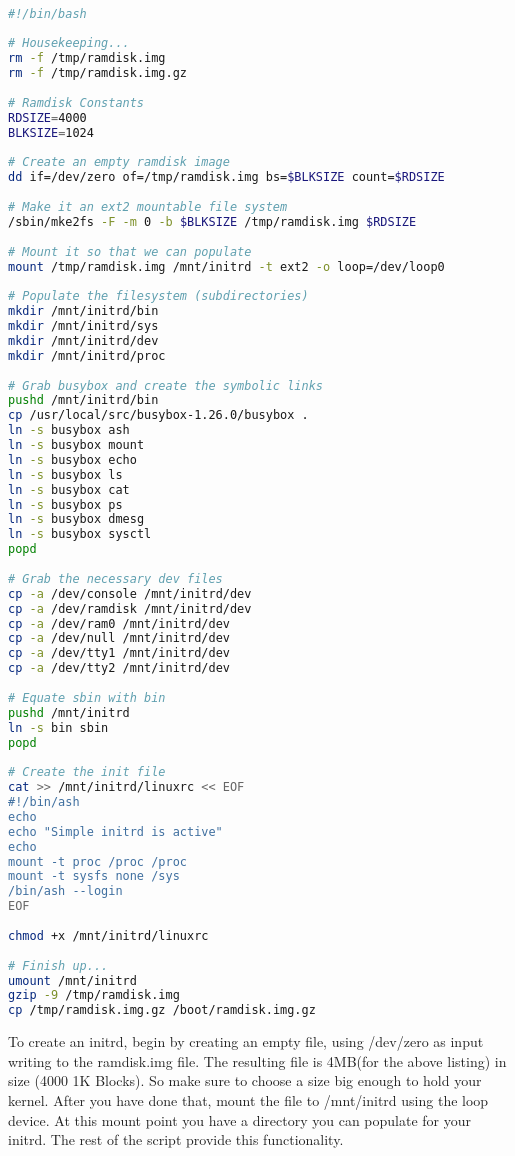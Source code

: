 \documentclass[a4paper,11pt]{report}
\begin{document}
\begin{lstlisting}[language=bash,caption={Manually creating initrd script}]

#!/bin/bash
 
# Housekeeping...
rm -f /tmp/ramdisk.img
rm -f /tmp/ramdisk.img.gz
 
# Ramdisk Constants
RDSIZE=4000
BLKSIZE=1024
 
# Create an empty ramdisk image
dd if=/dev/zero of=/tmp/ramdisk.img bs=$BLKSIZE count=$RDSIZE
 
# Make it an ext2 mountable file system
/sbin/mke2fs -F -m 0 -b $BLKSIZE /tmp/ramdisk.img $RDSIZE
 
# Mount it so that we can populate
mount /tmp/ramdisk.img /mnt/initrd -t ext2 -o loop=/dev/loop0
 
# Populate the filesystem (subdirectories)
mkdir /mnt/initrd/bin
mkdir /mnt/initrd/sys
mkdir /mnt/initrd/dev
mkdir /mnt/initrd/proc
 
# Grab busybox and create the symbolic links
pushd /mnt/initrd/bin
cp /usr/local/src/busybox-1.26.0/busybox .
ln -s busybox ash
ln -s busybox mount
ln -s busybox echo
ln -s busybox ls
ln -s busybox cat
ln -s busybox ps
ln -s busybox dmesg
ln -s busybox sysctl
popd
 
# Grab the necessary dev files
cp -a /dev/console /mnt/initrd/dev
cp -a /dev/ramdisk /mnt/initrd/dev
cp -a /dev/ram0 /mnt/initrd/dev
cp -a /dev/null /mnt/initrd/dev
cp -a /dev/tty1 /mnt/initrd/dev
cp -a /dev/tty2 /mnt/initrd/dev
 
# Equate sbin with bin
pushd /mnt/initrd
ln -s bin sbin
popd
 
# Create the init file
cat >> /mnt/initrd/linuxrc << EOF
#!/bin/ash
echo
echo "Simple initrd is active"
echo
mount -t proc /proc /proc
mount -t sysfs none /sys
/bin/ash --login
EOF
 
chmod +x /mnt/initrd/linuxrc
 
# Finish up...
umount /mnt/initrd
gzip -9 /tmp/ramdisk.img
cp /tmp/ramdisk.img.gz /boot/ramdisk.img.gz

\end{lstlisting}

To create an initrd, begin by creating an empty file, using /dev/zero as input 
writing to the ramdisk.img file. The resulting file is 4MB(for the above listing) in size (4000 1K Blocks).
So make sure to choose a size big enough to hold your kernel. After you have done
that, mount the file to /mnt/initrd using the loop device. At this mount point
you have a directory you can populate for your initrd. The rest of the script provide this functionality.
\end{document}

